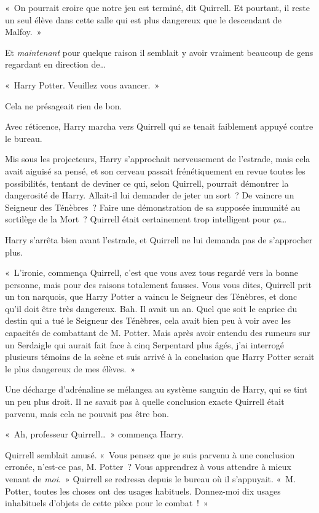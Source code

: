 «~On pourrait croire que notre jeu est terminé, dit Quirrell.
Et pourtant, il reste un seul élève dans cette salle qui est plus dangereux que le descendant de Malfoy.~»

Et \emph{maintenant} pour quelque raison il semblait y avoir vraiment beaucoup de gens regardant en direction de…

«~Harry Potter. Veuillez vous avancer.~»

Cela ne présageait rien de bon.

Avec réticence, Harry marcha vers Quirrell qui se tenait faiblement appuyé contre le bureau.

Mis sous les projecteurs, Harry s'approchait nerveusement de l'estrade, mais cela avait aiguisé sa pensé, et son cerveau passait frénétiquement en revue toutes les possibilités, tentant de deviner ce qui, selon Quirrell, pourrait démontrer la dangerosité de Harry.
Allait-il lui demander de jeter un sort~?
De vaincre un Seigneur des Ténèbres~?
Faire une démonstration de sa supposée immunité au sortilège de la Mort~?
Quirrell était certainement trop intelligent pour \emph{ça}…

Harry s'arrêta bien avant l'estrade, et Quirrell ne lui demanda pas de s'approcher plus.

«~L'ironie, commença Quirrell, c'est que vous avez tous regardé vers la bonne personne, mais pour des raisons totalement fausses.
Vous vous dites, Quirrell prit un ton narquois, que Harry Potter a vaincu le Seigneur des Ténèbres, et donc qu'il doit être très dangereux.
Bah. Il avait un an.
Quel que soit le caprice du destin qui a tué le Seigneur des Ténèbres, cela avait bien peu à voir avec les capacités de combattant de M. Potter.
Mais après avoir entendu des rumeurs sur un Serdaigle qui aurait fait face à cinq Serpentard plus âgés, j'ai interrogé plusieurs témoins de la scène et suis arrivé à la conclusion que Harry Potter serait le plus dangereux de mes élèves.~»

Une décharge d'adrénaline se mélangea au système sanguin de Harry, qui se tint un peu plus droit.
Il ne savait pas à quelle conclusion exacte Quirrell était parvenu, mais cela ne pouvait pas être bon.

«~Ah, professeur Quirrell…~» commença Harry.

Quirrell semblait amusé.
«~Vous pensez que je suis parvenu à une conclusion erronée, n'est-ce pas, M. Potter~?
Vous apprendrez à vous attendre à mieux venant de \emph{moi}.~»
Quirrell se redressa depuis le bureau où il s'appuyait.
«~M. Potter, toutes les choses ont des usages habituels.
Donnez-moi dix usages inhabituels d'objets de cette pièce pour le combat~!~»

